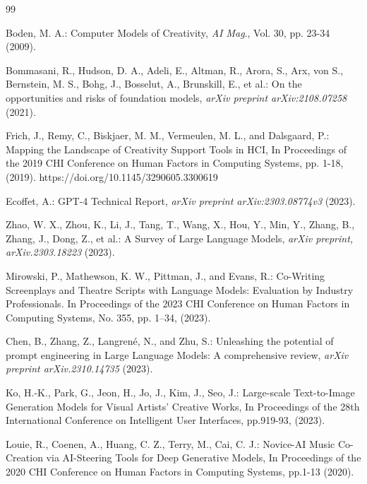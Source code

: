 \documentclass[a4j]{jarticle}
\begin{document}
\begin{thebibliography}{99}
\small

Boden, M. A.: Computer Models of Creativity, \textit{AI Mag}., Vol. 30, pp. 23-34 (2009).

Bommasani, R., Hudson, D. A., Adeli, E., Altman, R., Arora, S., Arx, von S., Bernstein, M. S., Bohg, J., Bosselut, A., Brunskill, E., et al.: On the opportunities and risks of foundation models, \textit{arXiv preprint arXiv:2108.07258} (2021).

Frich, J., Remy, C., Biskjaer, M. M., Vermeulen, M. L., and Dalsgaard, P.: Mapping the Landscape of Creativity Support Tools in HCI, In Proceedings of the 2019 CHI Conference on Human Factors in Computing Systems, pp. 1-18, (2019). https://doi.org/10.1145/3290605.3300619

Ecoffet, A.: GPT-4 Technical Report, \textit{arXiv preprint arXiv:2303.08774v3} (2023).

Zhao, W. X., Zhou, K., Li, J., Tang, T., Wang, X., Hou, Y., Min, Y., Zhang, B., Zhang, J., Dong, Z., et al.: A Survey of Large Language Models, \textit{arXiv preprint, arXiv.2303.18223} (2023).

Mirowski, P., Mathewson, K. W., Pittman, J., and Evans, R.: Co-Writing Screenplays and Theatre Scripts with Language Models: Evaluation by Industry Professionals. In Proceedings of the 2023 CHI Conference on Human Factors in Computing Systems, No. 355, pp. 1–34, (2023).

Chen, B., Zhang, Z., Langrené, N., and Zhu, S.: Unleashing the potential of prompt engineering in Large Language Models: A comprehensive review, \textit{arXiv preprint arXiv.2310.14735} (2023).

Ko, H.-K., Park, G., Jeon, H., Jo, J., Kim, J., Seo, J.: Large-scale Text-to-Image Generation Models for Visual Artists’ Creative Works, In Proceedings of the 28th International Conference on Intelligent User Interfaces, pp.919-93, (2023).

Louie, R., Coenen, A., Huang, C. Z., Terry, M., Cai, C. J.: Novice-AI Music Co-Creation via AI-Steering Tools for Deep Generative Models, In Proceedings of the 2020 CHI Conference on Human Factors in Computing Systems, pp.1-13 (2020).



\end{thebibliography}
\end{document}

